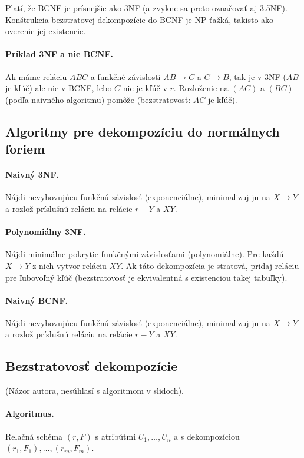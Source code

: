 \documentclass[10pt,a4paper]{article}
\begin{document}
Platí, že BCNF je prísnejšie ako 3NF (a zvykne sa preto označovať aj 3.5NF). 
Konštrukcia bezstratovej dekompozície do BCNF je NP ťažká, takisto ako overenie jej existencie. 

\paragraph{Príklad 3NF a nie BCNF.}
Ak máme reláciu $ABC$ a funkčné závislosti $AB \rightarrow C$ a $C \rightarrow B$,
tak je v 3NF ($AB$ je kľúč) ale nie v BCNF, lebo $C$ nie je kľúč v $r$. Rozloženie na $(AC)$ a $(BC)$ (podľa naivného algoritmu) pomôže (bezstratovosť: $AC$ je kľúč). 

\subsection{Algoritmy pre dekompozíciu do normálnych foriem}

\paragraph{Naivný 3NF.} Nájdi nevyhovujúcu funkčnú závislosť (exponenciálne), minimalizuj ju na $X \rightarrow Y$ a rozlož príslušnú reláciu na relácie $r-Y$ a $XY$. 

\paragraph{Polynomiálny 3NF.} Nájdi minimálne pokrytie funkčnými závislosťami (polynomiálne). Pre každú $X \rightarrow Y$ z nich vytvor reláciu $XY$. Ak táto dekompozícia je stratová, pridaj reláciu pre ľubovoľný kľúč (bezstratovosť je ekvivalentná s existenciou takej tabuľky).

\paragraph{Naivný BCNF.} Nájdi nevyhovujúcu funkčnú závislosť (exponenciálne), minimalizuj ju na $X \rightarrow Y$ a rozlož príslušnú reláciu na relácie $r-Y$ a $XY$. 

\subsection{Bezstratovosť dekompozície}
(Názor autora, nesúhlasí s algoritmom v slidoch). 

\paragraph{Algoritmus.}
Relačná schéma $(r,F)$ s atribútmi $U_1,\ldots,U_n$ a s dekompozíciou $(r_1, F_1),\ldots,(r_m, F_m)$.
\end{document}
